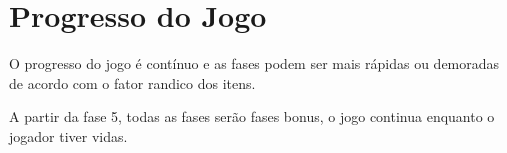 \section{Progresso do Jogo}
O progresso do jogo é contínuo e as fases podem ser mais rápidas ou demoradas de acordo com o fator randico dos itens.

A partir da fase 5, todas as fases serão fases bonus, o jogo continua enquanto o jogador tiver vidas.